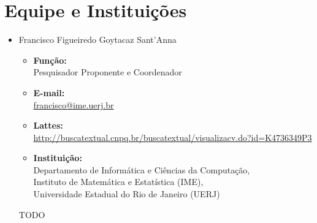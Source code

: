 \documentclass[titlepage,12pt]{article}
\begin{document}
\section{Equipe e Instituições}

\begin{itemize}
    \item Francisco Figueiredo Goytacaz Sant'Anna
    \begin{itemize}
        \item \textbf{Função:} \\
              Pesquisador Proponente e Coordenador
        \item \textbf{E-mail:} \\
              \url{francisco@ime.uerj.br}
        \item \textbf{Lattes:} \\
              {\scriptsize{\url{http://buscatextual.cnpq.br/buscatextual/visualizacv.do?id=K4736349P3}}}
        \item \textbf{Instituição:}                                 \\
              Departamento de Informática e Ciências da Computação, \\
              Instituto de Matemática e Estatística (IME),          \\
              Universidade Estadual do Rio de Janeiro (UERJ)
    \end{itemize}

    TODO

\end{itemize}
\end{document}
